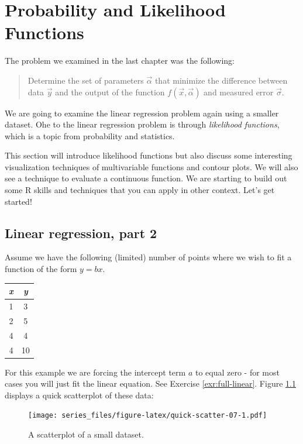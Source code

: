 \documentclass[
]{book}
\theoremstyle{definition}
\theoremstyle{definition}
\theoremstyle{definition}
\theoremstyle{remark}
\begin{document}
\hypertarget{likelihood-09}{%
\chapter{Probability and Likelihood Functions}\label{likelihood-09}}

The problem we examined in the last chapter was the following:

\begin{quote}
Determine the set of parameters \(\vec{\alpha}\) that minimize the difference between data \(\vec{y}\) and the output of the function \(f(\vec{x}, \vec{\alpha})\) and measured error \(\vec{\sigma}\).
\end{quote}

We are going to examine the linear regression problem again using a smaller dataset. Ohe to the linear regression problem is through \emph{likelihood functions}, which is a topic from probability and statistics.

This section will introduce likelihood functions but also discuss some interesting visualization techniques of multivariable functions and contour plots. We will also see a technique to evaluate a continuous function. We are starting to build out some R skills and techniques that you can apply in other context. Let's get started!

\hypertarget{linear-regression-part-2}{%
\section{Linear regression, part 2}\label{linear-regression-part-2}}

Assume we have the following (limited) number of points where we wish to fit a function of the form \(y=bx\).

\begin{longtable}[]{@{}cc@{}}
\toprule
\emph{x} & \emph{y} \\
\midrule
\endhead
1 & 3 \\
2 & 5 \\
4 & 4 \\
4 & 10 \\
\bottomrule
\end{longtable}

For this example we are forcing the intercept term \(a\) to equal zero - for most cases you will just fit the linear equation. See Exercise \ref{exr:full-linear}. Figure \ref{fig:quick-scatter-07} displays a quick scatterplot of these data:

\begin{figure}
\centering
\texttt{[image: series\_files/figure-latex/quick-scatter-07-1.pdf]}
\caption{\label{fig:quick-scatter-07}A scatterplot of a small dataset.}
\end{figure}
\end{document}
